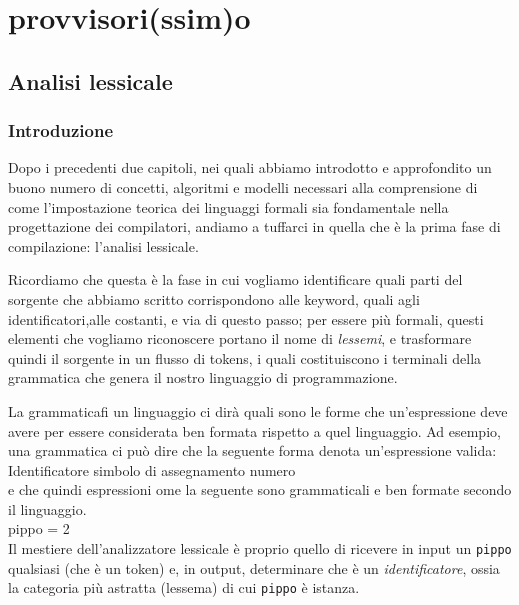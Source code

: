 \documentclass[class=book, crop=false, oneside, 12pt]{standalone}
\begin{document}
\chapter{provvisori(ssim)o}

\section{Analisi lessicale}
\subsection{Introduzione}
Dopo i precedenti due capitoli, nei quali abbiamo introdotto e approfondito un buono numero di concetti, algoritmi e modelli necessari alla comprensione di come l'impostazione teorica dei linguaggi formali sia fondamentale nella progettazione dei compilatori, andiamo a tuffarci in quella che è la prima fase di compilazione: l'analisi lessicale.


Ricordiamo che questa è la fase in cui vogliamo identificare quali parti del sorgente che abbiamo scritto corrispondono alle keyword, quali agli identificatori,alle costanti, e via di questo passo; per essere più formali, questi elementi che vogliamo riconoscere portano il nome di \emph{lessemi}, e trasformare quindi il sorgente in un flusso di tokens, i quali costituiscono i terminali della grammatica che genera il nostro linguaggio di programmazione.

La grammaticafi un linguaggio ci dirà quali sono le forme che un'espressione deve avere per essere considerata ben formata rispetto a quel linguaggio. Ad esempio, una grammatica ci può dire che la seguente forma denota un'espressione valida:\\
Identificatore      simbolo di assegnamento    numero\\
e che quindi espressioni ome la seguente sono grammaticali e ben formate secondo il linguaggio.\\
pippo = 2\\
Il mestiere dell'analizzatore lessicale è proprio quello di ricevere in input un \texttt{pippo} qualsiasi (che è un token) e, in output, determinare che è un \emph{identificatore}, ossia la categoria più astratta (lessema) di cui \texttt{pippo} è istanza.

\end{document}
